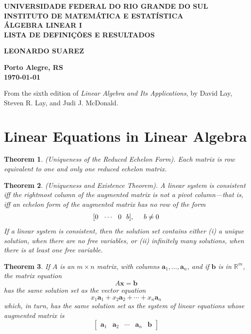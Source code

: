 \documentclass{article}
\theoremstyle{plain}
\newtheorem{thm}{Theorem}[section]
\theoremstyle{definition}
\theoremstyle{remark}
\begin{document}
\begin{center}
    \textbf{\large UNIVERSIDADE FEDERAL DO RIO GRANDE DO SUL} \\
    \textbf{\large INSTITUTO DE MATEMÁTICA E ESTATÍSTICA} \\
    \vspace{3cm}
    \textbf{\Large ÁLGEBRA LINEAR I} \\
    \vspace{1cm}
    \textbf{\large LISTA DE DEFINIÇÕES E RESULTADOS} \\
    \vspace{3cm}

    \textbf{LEONARDO SUAREZ}

    \vfill
    \textbf{\large Porto Alegre, RS} \\
    \textbf{\large \today}
\end{center}

\newpage
\tableofcontents
\newpage

\noindent From the sixth edition of \textit{Linear Algebra and Its Applications}, by David Lay, Steven R. Lay, and Judi J. McDonald.

\section{Linear Equations in Linear Algebra}

\begin{thm} (Uniqueness of the Reduced Echelon Form). 
    Each matrix is row equivalent to one and only one reduced echelon matrix.
\end{thm}

\begin{thm} (Uniqueness and Existence Theorem).
    A linear system is consistent iff the rightmost column of the augmented matrix is \textit{not} a pivot column---that is, iff an echelon form of the augmented matrix has \textit{no} row of the form \[[0\hspace{.25cm}\cdots\hspace{.25cm}0\hspace{.25cm} b],\hspace{.5cm}b\neq0\] If a linear system is consistent, then the solution set contains either (i) a unique solution, when there are no free variables, or (ii) infinitely many solutions, when there is at least one free variable.
\end{thm}

\begin{thm}
    If $A$ is an \(m\times n\) matrix, with columns $\textbf{a}_1,\ldots,\textbf{a}_n$, and if $\textbf{b}$ is in $\mathbb{R}^m$, the matrix equation $$A\textbf{x}=\textbf{b}$$ has the same solution set as the vector equation $$x_1\textbf{a}_1+x_2\textbf{a}_2+\cdots+x_n\textbf{a}_n$$ which, in turn, has the same solution set as the system of linear equations whose augmented matrix is
    \[
    \begin{bmatrix}
        \textbf{a}_1 & \textbf{a}_2 & \cdots & \textbf{a}_n & \textbf{b}
    \end{bmatrix}
    \]
\end{thm}
\end{document}
